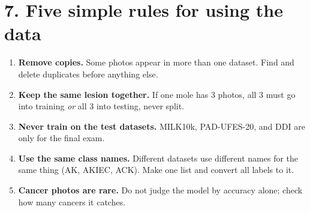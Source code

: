 \documentclass[11pt,a4paper]{article}
\begin{document}
\section*{7. Five simple rules for using the data}
\begin{enumerate}
  \item \textbf{Remove copies.} Some photos appear in more than one
        dataset. Find and delete duplicates before anything else.
  \item \textbf{Keep the same lesion together.} If one mole has 3 photos,
        all 3 must go into training \emph{or} all 3 into testing, never
        split.
  \item \textbf{Never train on the test datasets.} MILK10k, PAD-UFES-20,
        and DDI are only for the final exam.
  \item \textbf{Use the same class names.} Different datasets use
        different names for the same thing (AK, AKIEC, ACK). Make one
        list and convert all labels to it.
  \item \textbf{Cancer photos are rare.} Do not judge the model by
        accuracy alone; check how many cancers it catches.
\end{enumerate}

\end{document}
